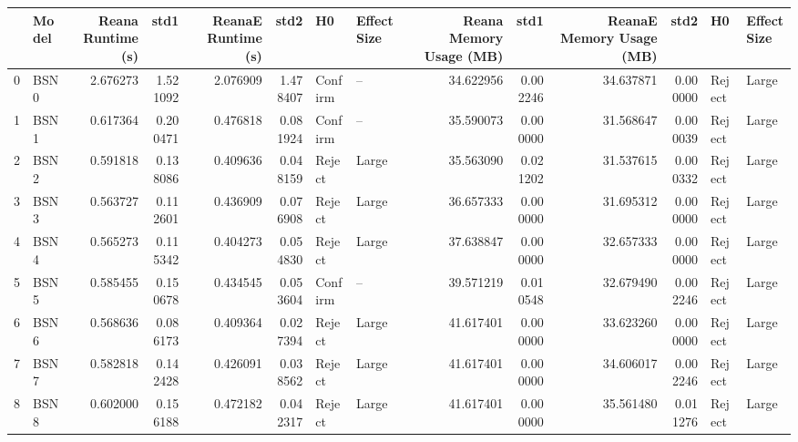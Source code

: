 \begin{tabular}{llrrrrllrrrrll}
\toprule
{} &   Model &  Reana Runtime (s) &       std1 &  ReanaE Runtime (s) &       std2 &       H0 & Effect Size &  Reana Memory Usage (MB) &        std1 &  ReanaE Memory Usage (MB) &        std2 &       H0 & Effect Size \\
\midrule
0  &   BSN 0 &           2.676273 &   1.521092 &            2.076909 &   1.478407 &  Confirm &          -- &                34.622956 &    0.002246 &                 34.637871 &    0.000000 &   Reject &       Large \\
1  &   BSN 1 &           0.617364 &   0.200471 &            0.476818 &   0.081924 &  Confirm &          -- &                35.590073 &    0.000000 &                 31.568647 &    0.000039 &   Reject &       Large \\
2  &   BSN 2 &           0.591818 &   0.138086 &            0.409636 &   0.048159 &   Reject &       Large &                35.563090 &    0.021202 &                 31.537615 &    0.000332 &   Reject &       Large \\
3  &   BSN 3 &           0.563727 &   0.112601 &            0.436909 &   0.076908 &   Reject &       Large &                36.657333 &    0.000000 &                 31.695312 &    0.000000 &   Reject &       Large \\
4  &   BSN 4 &           0.565273 &   0.115342 &            0.404273 &   0.054830 &   Reject &       Large &                37.638847 &    0.000000 &                 32.657333 &    0.000000 &   Reject &       Large \\
5  &   BSN 5 &           0.585455 &   0.150678 &            0.434545 &   0.053604 &  Confirm &          -- &                39.571219 &    0.010548 &                 32.679490 &    0.002246 &   Reject &       Large \\
6  &   BSN 6 &           0.568636 &   0.086173 &            0.409364 &   0.027394 &   Reject &       Large &                41.617401 &    0.000000 &                 33.623260 &    0.000000 &   Reject &       Large \\
7  &   BSN 7 &           0.582818 &   0.142428 &            0.426091 &   0.038562 &   Reject &       Large &                41.617401 &    0.000000 &                 34.606017 &    0.002246 &   Reject &       Large \\
8  &   BSN 8 &           0.602000 &   0.156188 &            0.472182 &   0.042317 &   Reject &       Large &                41.617401 &    0.000000 &                 35.561480 &    0.011276 &   Reject &       Large \\

\end{tabular}
